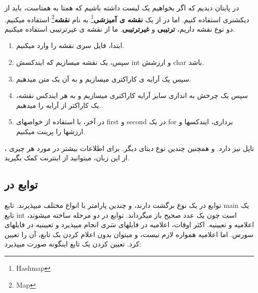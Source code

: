 \documentclass[14pt,a4paper]{memoir}
\begin{document}
 در پایتان دیدیم که اگر بخواهیم یک لیست داشته باشیم که همتا به همتاست، باید از دیکشنری استفاده کنیم. اما در  از یک \textbf{نقشه ی آمیزشی}\footnote{Hashmap} به نام \textbf{نقشه}\footnote{Map} استفاده میکنیم. دو نوع نقشه داریم، \textbf{ترتیبی} و \textbf{غیرترتیبی}. ما از نقشه ی غیرترتیبی استفاده میکنیم.
 	 	 \begin{latin}
 	
 \end{latin}
 
	 \begin{enumerate}
	 	\item ابتدا، فایل سری نقشه را وارد میکنیم.
	 	\item  سپس، یک نقشه میسازیم که ایندکسش int و ارزشش char باشد.
	 	\item  سپس یک آرایه ی کاراکتری میسازیم و به آن یک متن میدهیم.
	 	\item سپس یک چرخش به اندازی سایز آرایه کاراکتری میسازیم و به هر ایندکس نقشه، یک کاراکتر از آرایه را میدهیم.
	 	\item  در آخر، با استفاده از خواصهای first و second در یک for برداری، ایندکسها و ارزشها را پرینت میکنیم.
	 \end{enumerate}
	 
	 
	 
	\begin{tip}
		، تاپل نیز دارد. و همچنین چندین نوع دیتای دیگر. برای اطلاعات بیشتر در مورد هر چیزی از این زبان، میتوانید از اینترنت کمک بگیرید.
	\end{tip}
	 
	 
	 \subsection{توابع در }\label{cppfunc}
	 
	 توابع در  یک نوع برگشت دارند، و چندین پارامتر با انواع مختلف میپذیرند. تابع main یک تابع int است چون یک عدد صحیح باز میگرداند. توابع در دو مرحله ساخته میشوند، اعلامیه و تعیینیه. اکثر اوقات، اعلامیه در فایلهای سَری انجام میپذیرد و تعیینیه در فایلهای سورس. اما اعلامیه همواره لازم نیست، و میتوان بدون اعلام کردن یک تابع، آن را تعیین کرد. تعیین کردن یک تابع اینگونه صورت میپذیرد:
	 
\end{document}
